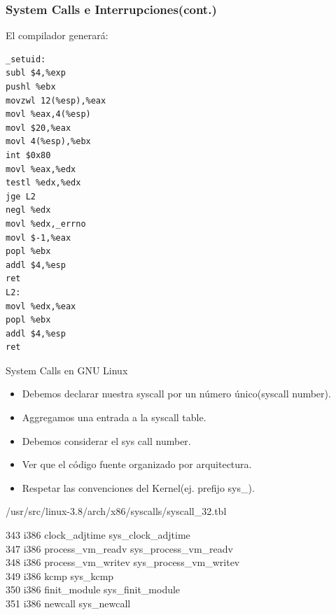 \begin{frame}[fragile]
\frametitle{System Calls e Interrupciones(cont.)}
El compilador generará:
\begin{lstlisting}
_setuid:
subl $4,%exp
pushl %ebx
movzwl 12(%esp),%eax
movl %eax,4(%esp)
movl $20,%eax
movl 4(%esp),%ebx
int $0x80
movl %eax,%edx
testl %edx,%edx
jge L2
negl %edx
movl %edx,_errno
movl $-1,%eax
popl %ebx
addl $4,%esp
ret
L2:
movl %edx,%eax
popl %ebx
addl $4,%esp
ret

\end{lstlisting}
\end{frame}

\begin{frame}{System Calls en GNU Linux}
   \begin{itemize}  
   \item Debemos declarar nuestra syscall por un número único(syscall number). 
   \item Aggregamos una entrada a la syscall table.
   \item Debemos considerar el sys call number.
   \item Ver que el código fuente organizado por arquitectura.
   \item Respetar las convenciones del Kernel(ej. prefijo sys\_).
 \end{itemize}

\begin{block}{/usr/src/linux-3.8/arch/x86/syscalls/syscall\_32.tbl}
  \begin{block}{}
     343     i386    clock\_adjtime            sys\_clock\_adjtime    \\           
     347     i386    process\_vm\_readv        sys\_process\_vm\_readv  \\          
     348     i386    process\_vm\_writev       sys\_process\_vm\_writev \\          
     349     i386    kcmp                      sys\_kcmp \\
     350     i386    finit\_module             sys\_finit\_module \\
     \alert{351     i386    newcall                   sys\_newcall} \\ 
  \end{block}

\end{block}

\end{frame}


